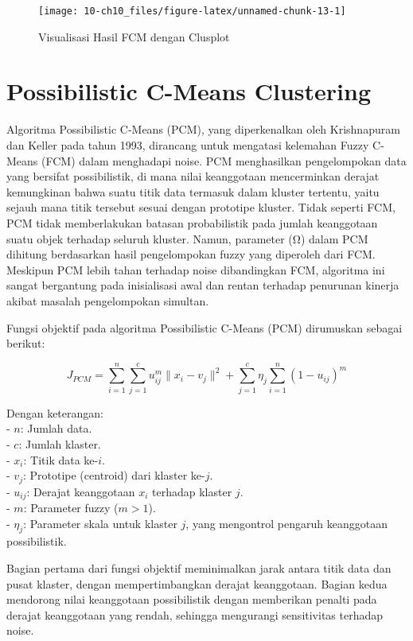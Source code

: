\documentclass[
  oneside]{book}
\begin{document}
\begin{figure}[h]

{\centering \texttt{[image: 10-ch10\_files/figure-latex/unnamed-chunk-13-1]} 

}

\caption{Visualisasi Hasil FCM dengan Clusplot}\label{fig:unnamed-chunk-13}
\end{figure}

\chapter{Possibilistic C-Means Clustering}\label{pcm}

Algoritma Possibilistic C-Means (PCM), yang diperkenalkan oleh Krishnapuram dan Keller pada tahun 1993, dirancang untuk mengatasi kelemahan Fuzzy C-Means (FCM) dalam menghadapi noise. PCM menghasilkan pengelompokan data yang bersifat possibilistik, di mana nilai keanggotaan mencerminkan derajat kemungkinan bahwa suatu titik data termasuk dalam kluster tertentu, yaitu sejauh mana titik tersebut sesuai dengan prototipe kluster. Tidak seperti FCM, PCM tidak memberlakukan batasan probabilistik pada jumlah keanggotaan suatu objek terhadap seluruh kluster. Namun, parameter (Ω) dalam PCM dihitung berdasarkan hasil pengelompokan fuzzy yang diperoleh dari FCM. Meskipun PCM lebih tahan terhadap noise dibandingkan FCM, algoritma ini sangat bergantung pada inisialisasi awal dan rentan terhadap penurunan kinerja akibat masalah pengelompokan simultan.

Fungsi objektif pada algoritma Possibilistic C-Means (PCM) dirumuskan sebagai berikut:

\[
J_{PCM} = \sum_{i=1}^n \sum_{j=1}^c u_{ij}^m \|x_i - v_j\|^2 + \sum_{j=1}^c \eta_j \sum_{i=1}^n (1 - u_{ij})^m
\]

Dengan keterangan:\\
- \(n\): Jumlah data.\\
- \(c\): Jumlah klaster.\\
- \(x_i\): Titik data ke-\(i\).\\
- \(v_j\): Prototipe (centroid) dari klaster ke-\(j\).\\
- \(u_{ij}\): Derajat keanggotaan \(x_i\) terhadap klaster \(j\).\\
- \(m\): Parameter fuzzy (\(m > 1\)).\\
- \(\eta_j\): Parameter skala untuk klaster \(j\), yang mengontrol pengaruh keanggotaan possibilistik.

Bagian pertama dari fungsi objektif meminimalkan jarak antara titik data dan pusat klaster, dengan mempertimbangkan derajat keanggotaan. Bagian kedua mendorong nilai keanggotaan possibilistik dengan memberikan penalti pada derajat keanggotaan yang rendah, sehingga mengurangi sensitivitas terhadap noise.
\end{document}
